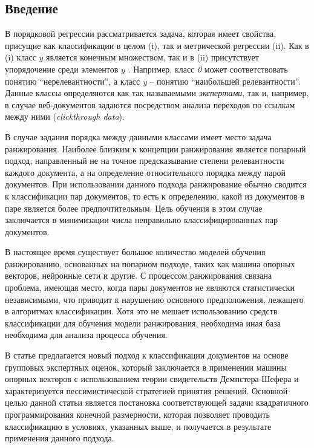 \documentclass[12pt,a4paper,oneside]{article}
\begin{document}
\begin{multicols}{2}
\chapter{Введение}

\par
В порядковой регрессии рассматривается задача, которая имеет свойства, присущие как классификации в целом (i), так и метрической регрессии (ii). 
Как в (i) класс $y$ является конечным множеством, так и в (ii) присутствует упорядочение среди элементов $y$ . 
Например, класс \emph{0} может соответствовать понятию ``нерелевантности'', а класс \emph{y} -- понятию ``наибольшей релевантности''. 
Данные классы определяются как так называемыми \emph{экспертами}, так и, например, в случае веб-документов задаются посредством анализа переходов по ссылкам между ними (\emph{clickthrough data}). 

\par
В случае задания порядка между данными классами имеет место задача ранжирования. 
Наиболее близким к концепции ранжирования является попарный подход, направленный не на точное предсказывание степени релевантности каждого документа, а на определение относительного порядка между парой документов. 
При использовании данного подхода ранжирование обычно сводится к классификации пар документов, то есть к определению, какой из документов в паре является более предпочтительным.
Цель обучения в этом случае заключается в минимизации числа неправильно классифицированных пар документов. 

\par
В настоящее время существует большое количество моделей обучения ранжированию, основанных на попарном подходе, таких как машина опорных векторов, нейронные сети и другие. 
С процессом ранжирования связана проблема, имеющая место, когда пары документов не являются статистически независимыми, что приводит к нарушению основного предположения, лежащего в алгоритмах классификации. 
Хотя это не мешает использованию средств классификации для обучения модели ранжирования, необходима иная база необходима для анализа процесса обучения. 

\par
В статье предлагается новый подход к классификации документов на основе групповых экспертных оценок, который заключается в применении машины опорных векторов с использованием теории свидетельств Демпстера-Шефера и характеризуется пессимистической стратегией принятия решений. 
Основной целью данной статьи является постановка соответствующей задачи квадратичного программирования конечной размерности, которая позволяет проводить классификацию в условиях, указанных выше, и получается в результате применения данного подхода.


\end{multicols}
\end{document}
